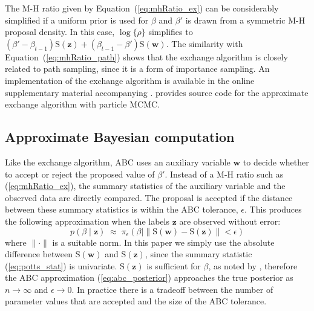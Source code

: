 \documentclass[nojss,shortnames]{jss}\usepackage[]{graphicx}\usepackage[]{color}
\begin{document}
The M-H ratio given by Equation~(\ref{eq:mhRatio_ex}) can be considerably simplified if a uniform prior is used for $\beta$ and $\beta'$ is drawn from a symmetric M-H proposal density. In this case, $\log\{\rho\}$ simplifies to $(\beta' - \beta_{t-1})\mathrm{S}(\mathbf{z}) + (\beta_{t-1} - \beta')\mathrm{S}(\mathbf{w})$. The similarity with Equation~(\ref{eq:mhRatio_path}) shows that the exchange algorithm is closely related to path sampling, since it is a form of importance sampling. An implementation of the exchange algorithm is available in the online supplementary material accompanying \citet{Friel2011}. \citet{Everitt2012} provides source code for the approximate exchange algorithm with particle MCMC.

\subsection{Approximate Bayesian computation}
Like the exchange algorithm, ABC uses an auxiliary variable $\mathbf{w}$ to decide whether to accept or reject the proposed value of $\beta'$. Instead of a M-H ratio such as (\ref{eq:mhRatio_ex}), the summary statistics of the auxiliary variable and the observed data are directly compared. The proposal is accepted if the distance between these summary statistics is within the ABC tolerance, $\epsilon$. This produces the following approximation when the labels $\mathbf{z}$ are observed without error:
\begin{equation}
\label{eq:abc_posterior}
p\left(\beta \mid \mathbf{z} \right) \;\approx\; \pi_\epsilon\left(\beta \mid \| \mathrm{S}(\mathbf{w}) - \mathrm{S}(\mathbf{z}) \| < \epsilon\right)
\end{equation}
where $\| \cdot \|$ is a suitable norm. In this paper we simply use the absolute difference between $\mathrm{S}(\mathbf{w})$ and $\mathrm{S}(\mathbf{z})$, since the summary statistic (\ref{eq:potts_stat}) is univariate. $\mathrm{S}(\mathbf{z})$ is sufficient for $\beta$, as noted by \citet{Grelaud2009}, therefore the ABC approximation (\ref{eq:abc_posterior}) approaches the true posterior as $n \to \infty$ and $\epsilon \to 0$. In practice there is a tradeoff between the number of parameter values that are accepted and the size of the ABC tolerance. 
\end{document}
